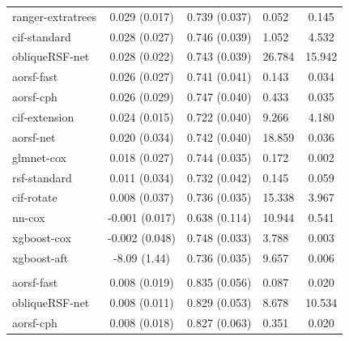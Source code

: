 \documentclass[twoside,11pt]{article}\usepackage[]{graphicx}\usepackage[]{xcolor}
\newenvironment{knitrout}{}{} %
\begin{document}
\begin{knitrout}
\begin{longtable}[t]{lcclc}
\hspace{1em}ranger-extratrees & 0.029 (0.017) & 0.739 (0.037) & 0.052 & 0.145\\
\hspace{1em}cif-standard & 0.028 (0.027) & 0.746 (0.039) & 1.052 & 4.532\\
\hspace{1em}obliqueRSF-net & 0.028 (0.022) & 0.743 (0.039) & 26.784 & 15.942\\
\hspace{1em}aorsf-fast & 0.026 (0.027) & 0.741 (0.041) & 0.143 & 0.034\\
\hspace{1em}aorsf-cph & 0.026 (0.029) & 0.747 (0.040) & 0.433 & 0.035\\
\hspace{1em}cif-extension & 0.024 (0.015) & 0.722 (0.040) & 9.266 & 4.180\\
\hspace{1em}aorsf-net & 0.020 (0.034) & 0.742 (0.040) & 18.859 & 0.036\\
\hspace{1em}glmnet-cox & 0.018 (0.027) & 0.744 (0.035) & 0.172 & 0.002\\
\hspace{1em}rsf-standard & 0.011 (0.034) & 0.732 (0.042) & 0.145 & 0.059\\
\hspace{1em}cif-rotate & 0.008 (0.037) & 0.736 (0.035) & 15.338 & 3.967\\
\hspace{1em}nn-cox & -0.001 (0.017) & 0.638 (0.114) & 10.944 & 0.541\\
\hspace{1em}xgboost-cox & -0.002 (0.048) & 0.748 (0.033) & 3.788 & 0.003\\
\hspace{1em}xgboost-aft & -8.09 (1.44) & 0.736 (0.035) & 9.657 & 0.006\\
\addlinespace[0.3em]
\hline
\multicolumn{5}{l}{\textit{\textbf{ACTG 320; death, n = 1151, p = 12}}}\\
\hline
\hspace{1em}aorsf-fast & 0.008 (0.019) & 0.835 (0.056) & 0.087 & 0.020\\
\hspace{1em}obliqueRSF-net & 0.008 (0.011) & 0.829 (0.053) & 8.678 & 10.534\\
\hspace{1em}aorsf-cph & 0.008 (0.018) & 0.827 (0.063) & 0.351 & 0.020\\

\end{longtable}
\end{knitrout}
\end{document}
